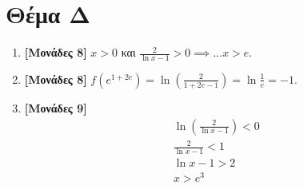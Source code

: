 \documentclass[12pt]{article}
\begin{document}
\section*{Θέμα Δ}
  \noindent
  \begin{enumerate}
    \item \textbf{[Μονάδες 8]}  $x >0$ και $\frac{2}{\ln x-1}>0 \implies \ldots x>e$.
    \item \textbf{[Μονάδες 8]}  $f(e^{1+2e})=\ln\left(\frac{2}{1+2e-1}\right)=\ln\frac{1}{e}=-1$.
    \item \textbf{[Μονάδες 9]} \begin{gather*}\ln\left(\frac{2}{\ln x-1}\right)<0 \\ \frac{2}{\ln x-1}<1 \\ \ln x - 1 > 2 \\ x>e^3\end{gather*}
  \end{enumerate}
\end{document}

